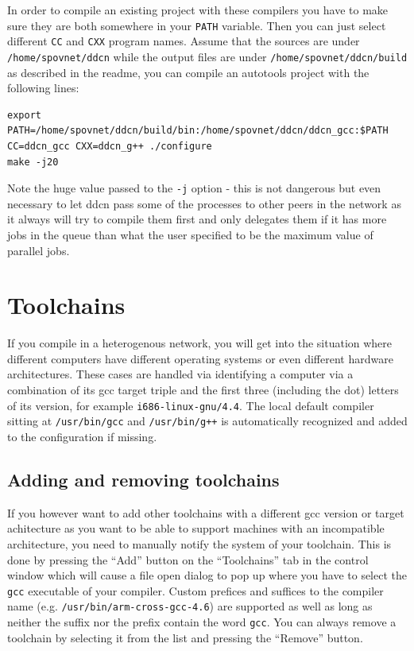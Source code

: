 \documentclass[a4paper,9pt]{scrartcl}
\begin{document}
In order to compile an existing project with these compilers you have to make sure they are both somewhere in your \texttt{PATH} variable. Then you can just select different \texttt{CC} and \texttt{CXX} program names. Assume that the sources are under \texttt{/home/spovnet/ddcn} while the output files are under \texttt{/home/spovnet/ddcn/build} as described in the readme, you can compile an autotools project with the following lines:

\begin{verbatim}
export PATH=/home/spovnet/ddcn/build/bin:/home/spovnet/ddcn/ddcn_gcc:$PATH
CC=ddcn_gcc CXX=ddcn_g++ ./configure
make -j20
\end{verbatim} 

Note the huge value passed to the \texttt{-j} option - this is not dangerous but even necessary to let ddcn pass some of the processes to other peers in the network as it always will try to compile them first and only delegates them if it has more jobs in the queue than what the user specified to be the maximum value of parallel jobs.

\section{Toolchains}

If you compile in a heterogenous network, you will get into the situation where different computers have different operating systems or even different hardware architectures. These cases are handled via identifying a computer via a combination of its gcc target triple and the first three (including the dot) letters of its version, for example \texttt{i686-linux-gnu/4.4}. The local default compiler sitting at \texttt{/usr/bin/gcc} and \texttt{/usr/bin/g++} is automatically recognized and added to the configuration if missing.

\subsection{Adding and removing toolchains}

If you however want to add other toolchains with a different gcc version or target achitecture as you want to be able to support machines with an incompatible architecture, you need to manually notify the system of your toolchain. This is done by pressing the ``Add'' button on the ``Toolchains'' tab in the control window which will cause a file open dialog to pop up where you have to select the \texttt{gcc} executable of your compiler. Custom prefices and suffices to the compiler name (e.g. \texttt{/usr/bin/arm-cross-gcc-4.6}) are supported as well as long as neither the suffix nor the prefix contain the word \texttt{gcc}. You can always remove a toolchain by selecting it from the list and pressing the ``Remove'' button.
\end{document}

